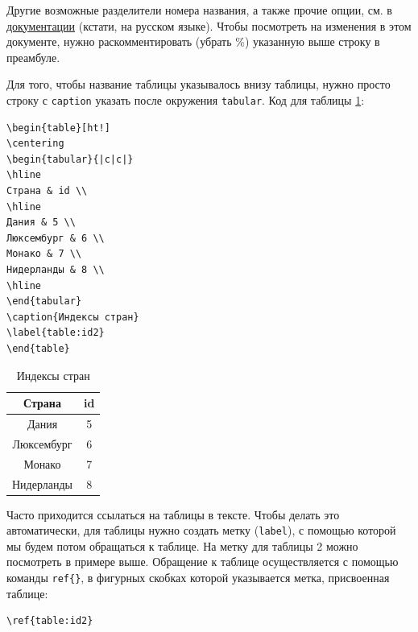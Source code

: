 \documentclass[12pt]{article}
\begin{document}
Другие возможные разделители номера  названия, а также прочие опции, см. в \href{http://mirrors.mi.ras.ru/CTAN/macros/latex/contrib/caption/caption-rus.pdf}{документации} (кстати, на русском языке). Чтобы посмотреть на изменения в этом документе, нужно раскомментировать (убрать \%) указанную выше строку в преамбуле.

Для того, чтобы название таблицы указывалось внизу таблицы, нужно просто строку с \texttt{caption} указать после окружения \texttt{tabular}. Код для таблицы \ref{table:id2}: \medskip\\


\begin{BVerbatim}
\begin{table}[ht!]
\centering
\begin{tabular}{|c|c|}
\hline
Страна & id \\
\hline
Дания & 5 \\
Люксембург & 6 \\
Монако & 7 \\
Нидерланды & 8 \\
\hline
\end{tabular}
\caption{Индексы стран}
\label{table:id2}
\end{table}
\end{BVerbatim} 

\begin{table}[ht!]
\centering
\begin{tabular}{|c|c|}
\hline
Страна & id \\
\hline
Дания & 5 \\
Люксембург & 6 \\
Монако & 7 \\
Нидерланды & 8 \\
\hline
\end{tabular}
\caption{Индексы стран}\label{table:id2}
\end{table}

Часто приходится ссылаться на таблицы в тексте. Чтобы делать это автоматически, для таблицы нужно создать метку (\texttt{label}), с помощью которой мы будем потом обращаться к таблице. На метку для таблицы 2 можно посмотреть в примере выше. Обращение к таблице осуществляется с помощью команды \texttt{ref\{\}}, в фигурных скобках которой указывается метка, присвоенная таблице:

\begin{center}
\begin{BVerbatim}
\ref{table:id2}
\end{BVerbatim}
\end{center}
\end{document}
